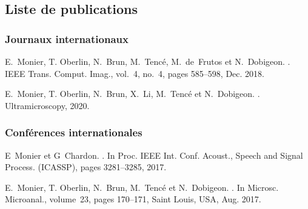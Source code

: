 \begin{fullwidth}
    \chapter*{Liste de publications}\label{ch-liste-publis}
    
    \subsection*{Journaux internationaux}
    

        E.~Monier, T. Oberlin, N.~Brun, M.~Tenc\'e, M.~de~Frutos et N.~Dobigeon.
        .
        \newblock IEEE Trans. Comput. Imag., vol.~4, no.~4, pages 585--598, Dec. 2018.

        E.~Monier, T. Oberlin, N.~Brun, X.~Li, M.~Tenc\'e et N.~Dobigeon.
        .
        \newblock Ultramicroscopy, 2020.


    \subsection*{Conférences internationales}
    

        E~Monier et G~Chardon.
        .
        \newblock In Proc. IEEE Int. Conf. Acoust., Speech and Signal Process.
          (ICASSP), pages 3281--3285, 2017.

        E.~Monier, T. Oberlin, N.~Brun, M.~Tenc\'e et N.~Dobigeon.
        .
        \newblock In Microsc. Microanal., volume~23, pages 170--171, Saint Louis, USA,
          Aug. 2017.


\end{fullwidth}
